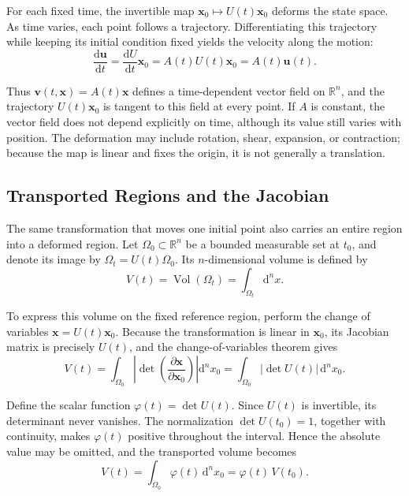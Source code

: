 \documentclass[10pt,a4paper]{article}
\newcommand{\R}{\mathbb{R}}
\newcommand{\dd}{\mathrm{d}}
\DeclareMathOperator{\Vol}{Vol}
\numberwithin{equation}{section}
\theoremstyle{definition}
\begin{document}
For each fixed time, the invertible map $\mathbf{x}_0\mapsto U(t)\mathbf{x}_0$ deforms the state space. As time varies, each point follows a trajectory. Differentiating this trajectory while keeping its initial condition fixed yields the velocity along the motion:
\begin{equation}
\frac{\dd\mathbf{u}}{\dd t}
=\frac{\dd U}{\dd t}\mathbf{x}_0
=A(t)U(t)\mathbf{x}_0
=A(t)\mathbf{u}(t).
\label{eq:velocity}
\end{equation}

Thus $\mathbf{v}(t,\mathbf{x})=A(t)\mathbf{x}$ defines a time-dependent vector field on $\R^n$, and the trajectory $U(t)\mathbf{x}_0$ is tangent to this field at every point. If $A$ is constant, the vector field does not depend explicitly on time, although its value still varies with position. The deformation may include rotation, shear, expansion, or contraction; because the map is linear and fixes the origin, it is not generally a translation.

\subsection{Transported Regions and the Jacobian}

The same transformation that moves one initial point also carries an entire region into a deformed region. Let $\Omega_0\subset\R^n$ be a bounded measurable set at $t_0$, and denote its image by $\Omega_t=U(t)\Omega_0$. Its $n$-dimensional volume is defined by
\begin{equation}
V(t)=\Vol(\Omega_t)=\int_{\Omega_t}\dd^n x.
\label{eq:volume-definition}
\end{equation}

To express this volume on the fixed reference region, perform the change of variables $\mathbf{x}=U(t)\mathbf{x}_0$. Because the transformation is linear in $\mathbf{x}_0$, its Jacobian matrix is precisely $U(t)$, and the change-of-variables theorem gives
\begin{equation}
V(t)=\int_{\Omega_0}
\left|\det\!\left(\frac{\partial\mathbf{x}}{\partial\mathbf{x}_0}\right)\right|
\dd^n x_0
=\int_{\Omega_0}|\det U(t)|\,\dd^n x_0.
\label{eq:change-of-variables}
\end{equation}

Define the scalar function $\varphi(t)=\det U(t)$. Since $U(t)$ is invertible, its determinant never vanishes. The normalization $\det U(t_0)=1$, together with continuity, makes $\varphi(t)$ positive throughout the interval. Hence the absolute value may be omitted, and the transported volume becomes
\begin{equation}
V(t)=\int_{\Omega_0}\varphi(t)\,\dd^n x_0
=\varphi(t)\,V(t_0).
\label{eq:volume-factor}
\end{equation}
\end{document}
